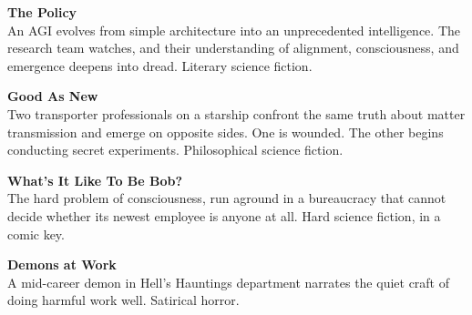 \bigskip

\textbf{The Policy}\\
An AGI evolves from simple architecture into an unprecedented intelligence. The research team watches, and their understanding of alignment, consciousness, and emergence deepens into dread. Literary science fiction.

\bigskip

\textbf{Good As New}\\
Two transporter professionals on a starship confront the same truth about matter transmission and emerge on opposite sides. One is wounded. The other begins conducting secret experiments. Philosophical science fiction.

\bigskip

\textbf{What's It Like To Be Bob?}\\
The hard problem of consciousness, run aground in a bureaucracy that cannot decide whether its newest employee is anyone at all. Hard science fiction, in a comic key.

\bigskip

\textbf{Demons at Work}\\
A mid-career demon in Hell's Hauntings department narrates the quiet craft of doing harmful work well. Satirical horror.
